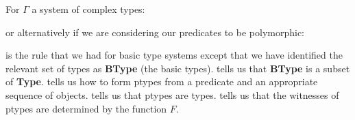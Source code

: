 \begin{ex}
For $\Gamma$ a system of complex types: 
\begin{subex} 
 
\item  \begin{prooftree}
 
\end{prooftree}
 
\item \begin{prooftree}
 
\end{prooftree}

\item \begin{prooftree}
   
\end{prooftree}

\medskip

or alternatively if we are considering our predicates to be
polymorphic:

\medskip

\begin{prooftree}
   
\end{prooftree}

\item \begin{prooftree}
 
\end{prooftree}

\item \begin{prooftree}
 
\end{prooftree} 
 
\end{subex} 
   
\end{ex} 
 is the rule that we had for basic type systems except that
we have identified the relevant set of types as \textbf{BType} (the
basic types).   tells us that \textbf{BType} is a subset of
\textbf{Type}.  tells us how to form ptypes from a predicate
and an appropriate sequence of objects.  tells us that
ptypes are types.   tells us that the witnesses of ptypes
are determined by the function $F$.
  

